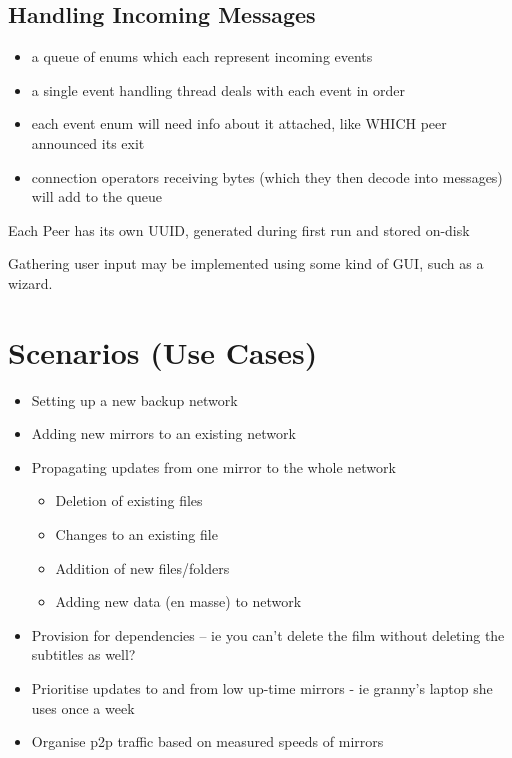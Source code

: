\documentclass[12pt,a4paper,]{adreport}
\begin{document}
\section{Handling Incoming Messages}\label{handling-incoming-messages}

\begin{itemize}
\itemsep1pt\parskip0pt
\item
  a queue of enums which each represent incoming events
\item
  a single event handling thread deals with each event in order
\item
  each event enum will need info about it attached, like WHICH peer
  announced its exit
\item
  connection operators receiving bytes (which they then decode into
  messages) will add to the queue
\end{itemize}

Each Peer has its own UUID, generated during first run and stored
on-disk

Gathering user input may be implemented using some kind of GUI, such as
a wizard.

\chapter{Scenarios (Use Cases)}\label{scenarios-use-cases}

\begin{itemize}
\itemsep1pt\parskip0pt
\item
  Setting up a new backup network
\item
  Adding new mirrors to an existing network
\item
  Propagating updates from one mirror to the whole network

  \begin{itemize}
  \itemsep1pt\parskip0pt
  \item
    Deletion of existing files
  \item
    Changes to an existing file
  \item
    Addition of new files/folders
  \item
    Adding new data (en masse) to network
  \end{itemize}
\item
  Provision for dependencies -- ie you can't delete the film without
  deleting the subtitles as well?
\item
  Prioritise updates to and from low up-time mirrors - ie granny's
  laptop she uses once a week
\item
  Organise p2p traffic based on measured speeds of mirrors
\end{itemize}
\end{document}
